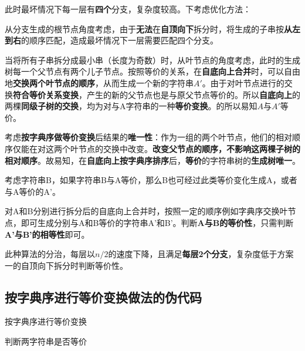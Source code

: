 \documentclass{article}
\begin{document}
此时最坏情况下每一层有\textbf{四个}分支，复杂度较高。下考虑优化方法：

从分支生成的根节点角度考虑，由于\textbf{无法}在\textbf{自顶向下}拆分时，将生成的子串按\textbf{从左到右}的顺序匹配，造成最坏情况下一层需要匹配四个分支。

当将所有子串拆分成最小串（长度为奇数）时，从叶节点的角度考虑，此时的生成树每一个父节点有两个儿子节点。按照等价的关系，在\textbf{自底向上合并}时，可以自由地\textbf{交换两个叶节点的顺序}，从而生成一个新的字符串$A'$。由于对叶节点进行的交换\textbf{符合等价关系变换}，产生的新的父节点也是与原父节点等价的。所以\textbf{自底向上}的两棵\textbf{同级子树的交换}，均为对与A字符串的一种\textbf{等价变换}。的所以易知$A$与$A'$等价。

考虑\textbf{按字典序做等价变换}后结果的\textbf{唯一性}：作为一组的两个叶节点，他们的相对顺序仅能在对这两个叶节点的交换中改变。\textbf{改变父节点的顺序，不影响这两棵子树的相对顺序}。故易知，在\textbf{自底向上按字典序排序}后，\textbf{等价}的字符串树的\textbf{生成树唯一}。

考虑字符串B，如果字符串B与A等价，那么B也可经过此类等价变化生成A，或者与A等价的A'。

对A和B分别进行拆分后的自底向上合并时，按照一定的顺序例如字典序交换叶节点，即可生成分别与A和B等价的字符串A'和B'。判断\textbf{A与B的等价性}，只需判断\textbf{A'与B'的相等性}即可。

此种算法的分治，每层以$n/2$的速度下降，且满足\textbf{每层2个分支}，复杂度低于方案一的自顶向下拆分时判断等价性。

\subsection{按字典序进行等价变换做法的伪代码}

\begin{algorithm}[H]

\caption{按字典序进行等价变换}
\LinesNumbered
{}

\end{algorithm}

\begin{algorithm}[H]

\caption{判断两字符串是否等价}
\LinesNumbered
{}

\end{algorithm}
\end{document}
